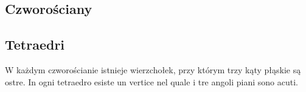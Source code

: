 
%

\subsection{Czworościany} %
\subsection{Tetraedri} %

W każdym czworościanie istnieje wierzchołek, przy którym trzy kąty płąskie są ostre. %
In ogni tetraedro esiste un vertice nel quale i tre angoli piani sono acuti. %

